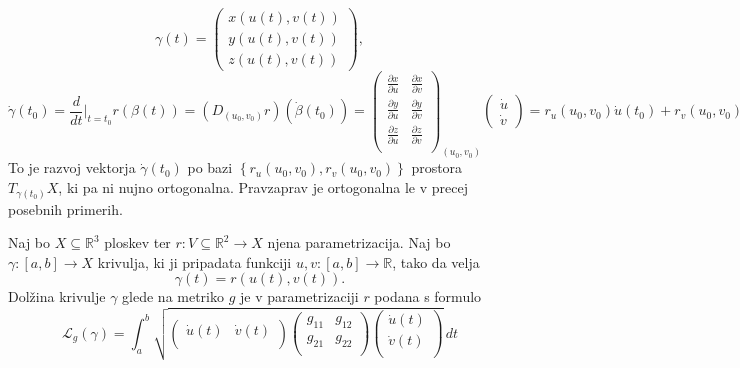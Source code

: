 \begin{equation*} \gamma(t) =  \begin{pmatrix}x(u(t), v(t))\\ y(u(t), v(t)) \\
z(u(t), v(t)) \end{pmatrix}, \end{equation*}
\begin{equation*} \dot{\gamma}(t_0) = \frac{d}{dt} \big|_{t = t_0} r(\beta(t)) =
(D_{(u_0, v_0)}r)(\dot{\beta}(t_0)) = 
\begin{pmatrix}
	\frac{ \partial x }{ \partial u }  & \frac{ \partial x }{ \partial v }  \\
	\frac{ \partial y }{ \partial u }  & \frac{ \partial y }{ \partial
	v }  \\
	\frac{ \partial z }{ \partial u }  & \frac{ \partial z }{ \partial v }  \\

\end{pmatrix}_{(u_0, v_0)}
\begin{pmatrix}
	\dot{u} \\ \dot{v}
\end{pmatrix}
 = r_u(u_0 , v_0)\dot{u}(t_0) + r_v(u_0 , v_0)\dot{v}(t_0). \end{equation*}
 To je razvoj vektorja $\dot{\gamma}(t_0)$ po bazi $\left\{ r_u(u_0 ,
v_0), r_v(u_0 , v_0) \right\}$ prostora $T_{\gamma(t_0)}X$, ki pa ni
nujno ortogonalna. Pravzaprav je ortogonalna le v precej posebnih
primerih. 

\begin{definicija}
\label{def_dolzina_krivulje}
Naj bo $X \subseteq \mathbb{R}^3$ ploskev ter $r: V \subseteq \mathbb{R}^2 \to X$ njena parametrizacija. Naj bo $\gamma: [a,b] \to  X$ krivulja, ki ji pripadata funkciji $u, v: [a,b] \to  \mathbb{R}$, tako da velja \begin{equation*}
\gamma(t) = r(u(t), v(t)).
\end{equation*}  
   Dolžina krivulje $\gamma$ glede na metriko $g$ je v parametrizaciji $r$ podana s formulo 
\begin{equation*} \mathcal{L}_g(\gamma) = \int_{a}^{b} \sqrt{ 
\begin{pmatrix}
    \dot{u}(t) & \dot{v}(t) \\
\end{pmatrix}
\begin{pmatrix}
	g_{11} & g_{12}  \\
	g_{21} & g_{22} \\
\end{pmatrix}
\begin{pmatrix}
	\dot{u}(t) \\
	\dot{v}(t) \\
\end{pmatrix}
}  \, dt  \end{equation*}
\end{definicija}


